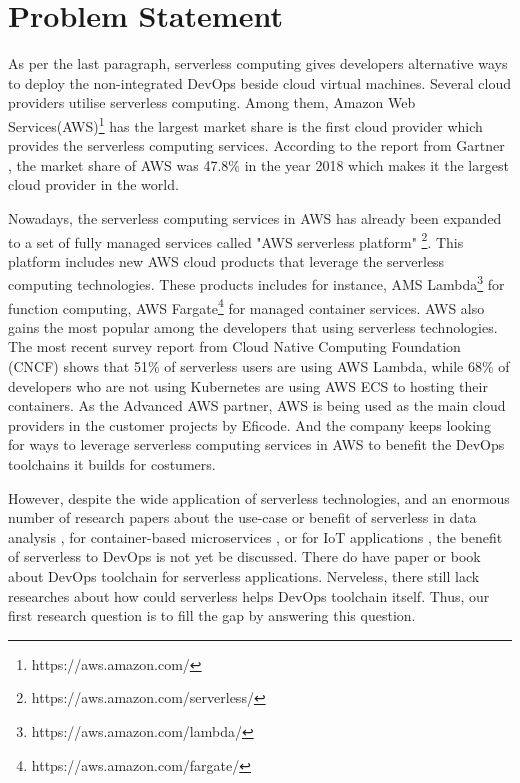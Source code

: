\section{Problem Statement}
As per the last paragraph, serverless computing gives developers alternative ways to deploy the non-integrated DevOps beside cloud virtual machines. Several cloud providers utilise serverless computing. Among them, Amazon Web Services(AWS)\footnote{https://aws.amazon.com/} has the largest market share is the first cloud provider which provides the serverless computing services. According to the report from Gartner \cite{GartnerS47:online}, the market share of AWS was 47.8\% in the year 2018 which makes it the largest cloud provider in the world.
\par
Nowadays, the serverless computing services in AWS has already been expanded to a set of fully managed services called "AWS serverless platform" \footnote{https://aws.amazon.com/serverless/}. This platform includes new AWS cloud products that leverage the serverless computing technologies. These products includes for instance, AMS Lambda\footnote{https://aws.amazon.com/lambda/} for function computing, AWS Fargate\footnote{https://aws.amazon.com/fargate/} for managed container services.
AWS also gains the most popular among the developers that using serverless technologies. The most recent survey report \cite{cncf2020} from Cloud Native Computing Foundation (CNCF) shows that 51\% of serverless users are using AWS Lambda, while 68\% of developers who are not using Kubernetes are using AWS ECS to hosting their containers.
As the Advanced AWS partner, AWS is being used as the main cloud providers in the customer projects by Eficode. And the company keeps looking for ways to leverage serverless computing services in AWS to benefit the DevOps toolchains it builds for costumers.
\par
However, despite the wide application of serverless technologies, and an enormous number of research papers about the use-case or benefit of serverless in data analysis \cite{8457831}, for container-based microservices \cite{perez2018serverless}, or for IoT applications \cite{nastic2017serverless} \cite{glikson2017deviceless}, the benefit of serverless to DevOps is not yet be discussed. There do have paper \cite{ivanov2018implementation} or book \cite{bangera2018devops} about DevOps toolchain for serverless applications. Nerveless, there still lack researches about how could serverless helps DevOps toolchain itself. Thus, our first research question is to fill the gap by answering this question. 
